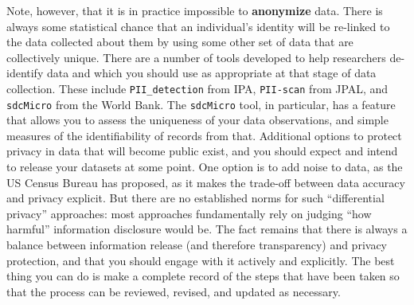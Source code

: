 Note, however, that it is in practice impossible to \textbf{anonymize} data.
There is always some statistical chance that an individual's identity
will be re-linked to the data collected about them
by using some other set of data that are collectively unique.
There are a number of tools developed to help researchers de-identify data
and which you should use as appropriate at that stage of data collection.
These include \texttt{PII\_detection} from IPA,
\texttt{PII-scan} from JPAL,
and \texttt{sdcMicro} from the World Bank.
The \texttt{sdcMicro} tool, in particular, has a feature
that allows you to assess the uniqueness of your data observations,
and simple measures of the identifiability of records from that.
Additional options to protect privacy in data that will become public exist,
and you should expect and intend to release your datasets at some point.
One option is to add noise to data, as the US Census Bureau has proposed,
as it makes the trade-off between data accuracy and privacy explicit.
But there are no established norms for such ``differential privacy'' approaches:
most approaches fundamentally rely on judging ``how harmful'' information disclosure would be.
The fact remains that there is always a balance between information release (and therefore transparency)
and privacy protection, and that you should engage with it actively and explicitly.
The best thing you can do is make a complete record of the steps that have been taken
so that the process can be reviewed, revised, and updated as necessary.
